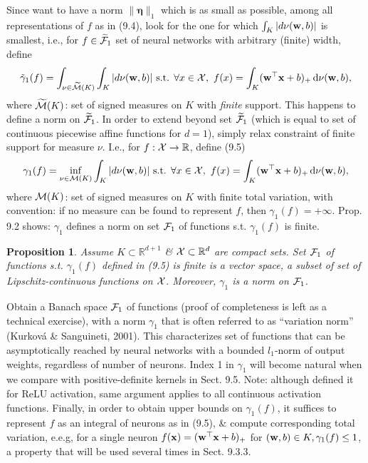 \documentclass{article}
\newtheorem{proposition}{Proposition}
\begin{document}
\begin{enumerate}
\begin{itemize}
\begin{itemize}
\begin{itemize}
				Since want to have a norm $\|\boldsymbol{\eta}\|_1$ which is as small as possible, among all representations of $f$ as in (9.4), look for the one for which $\int_K |d\nu({\bf w},b)|$ is smallest, i.e., for $f\in\widetilde{\cal F}_1$ set of neural networks with arbitrary (finite) width, define
				\begin{equation}
					\tilde{\gamma}_1(f) = \int_{\nu\in\widetilde{\cal M}(K)} \int_K |d\nu({\bf w},b)|\mbox{ s.t. }\forall x\in{\cal X},\ f(x) = \int_K ({\bf w}^\top{\bf x} + b)_+\,{\rm d}\nu({\bf w},b),
				\end{equation}
				where $\widetilde{\cal M}(K)$: set of signed measures on $K$ with {\it finite} support. This happens to define a norm on $\widetilde{\cal F}_1$. In order to extend beyond set $\widetilde{\cal F}_1$ (which is equal to set of continuous piecewise affine functions for $d = 1$), simply relax constraint of finite support for measure $\nu$. I.e., for $f:{\cal X}\to\mathbb{R}$, define (9.5)
				\begin{equation}
					\gamma_1(f) = \inf_{\nu\in{\cal M}(K)} \int_K |d\nu({\bf w},b)|\mbox{ s.t. }\forall x\in{\cal X},\ f(x) = \int_K ({\bf w}^\top{\bf x} + b)_+\,{\rm d}\nu({\bf w},b),
				\end{equation}
				where ${\cal M}(K)$: set of signed measures on $K$ with finite total variation, with convention: if no measure can be found to represent $f$, then $\gamma_1(f) = +\infty$. Prop. 9.2 shows: $\gamma_1$ defines a norm on set ${\cal F}_1$ of functions s.t. $\gamma_1(f)$ is finite.
				
				\begin{proposition}
					Assume $K\subset\mathbb{R}^{d+1}$ \& ${\cal X}\subset\mathbb{R}^d$ are compact sets. Set ${\cal F}_1$ of functions s.t. $\gamma_1(f)$ defined in (9.5) is finite is a vector space, a subset of set of Lipschitz-continuous functions on ${\cal X}$. Moreover, $\gamma_1$ is a norm on ${\cal F}_1$.
				\end{proposition}
				Obtain a Banach space ${\cal F}_1$ of functions (proof of completeness is left as a technical exercise), with a norm $\gamma_1$ that is often referred to as ``variation norm'' (Kurková \& Sanguineti, 2001). This characterizes set of functions that can be asymptotically reached by neural networks with a bounded $l_1$-norm of output weights, regardless of number of neurons. Index 1 in $\gamma_1$ will become natural when we compare with positive-definite kernels in Sect. 9.5. Note: although defined it for ReLU activation, same argument applies to all continuous activation functions. Finally, in order to obtain upper bounds on $\gamma_1(f)$, it suffices to represent $f$ as an integral of neurons as in (9.5), \& compute corresponding total variation, e.e.g, for a single neuron $f({\bf x}) = ({\bf w}^\top{\bf x} + b)_+$ for $({\bf w},b)\in K,\gamma_1(f)\le1$, a property that will be used several times in Sect. 9.3.3.
				

\end{itemize}
\end{itemize}
\end{itemize}
\end{enumerate}
\end{document}
